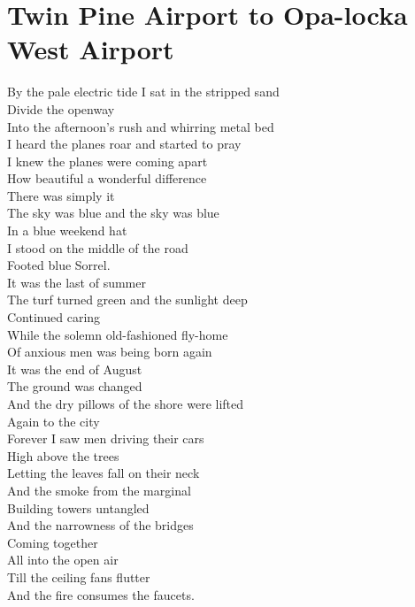 \documentclass[smalldemyvopaper,11pt,twoside,onecolumn,openright,extrafontsizes]{memoir}
\begin{document}
\chapter{Twin Pine Airport to Opa-locka West Airport}
By the pale electric tide I sat in the stripped sand
\\Divide the openway
\\Into the afternoon's rush and whirring metal bed
\\I heard the planes roar and started to pray
\\I knew the planes were coming apart
\\How beautiful a wonderful difference
\\There was simply it
\\The sky was blue and the sky was blue
\\In a blue weekend hat
\\I stood on the middle of the road
\\Footed blue Sorrel.
\\It was the last of summer
\\The turf turned green and the sunlight deep
\\Continued caring
\\While the solemn old-fashioned fly-home
\\Of anxious men was being born again
\\It was the end of August
\\The ground was changed
\\And the dry pillows of the shore were lifted
\\Again to the city
\\Forever I saw men driving their cars
\\High above the trees
\\Letting the leaves fall on their neck
\\And the smoke from the marginal
\\Building towers untangled
\\And the narrowness of the bridges
\\Coming together
\\All into the open air
\\Till the ceiling fans flutter
\\And the fire consumes the faucets.
\end{document}
